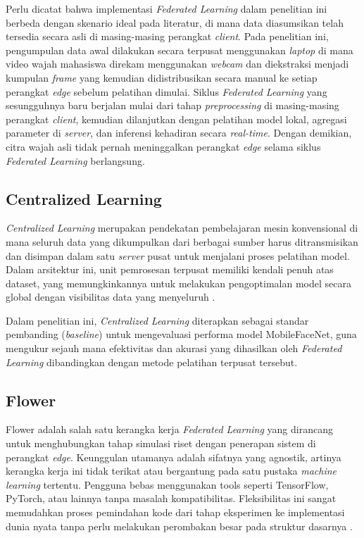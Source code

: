 Perlu dicatat bahwa implementasi \textit{Federated Learning} dalam penelitian ini berbeda dengan skenario ideal pada literatur, di mana data diasumsikan telah tersedia secara asli di masing-masing perangkat \textit{client}. Pada penelitian ini, pengumpulan data awal dilakukan secara terpusat menggunakan \textit{laptop} di mana video wajah mahasiswa direkam menggunakan \textit{webcam} dan diekstraksi menjadi kumpulan \textit{frame} yang kemudian didistribusikan secara manual ke setiap perangkat \textit{edge} sebelum pelatihan dimulai. Siklus \textit{Federated Learning} yang sesungguhnya baru berjalan mulai dari tahap \textit{preprocessing} di masing-masing perangkat \textit{client}, kemudian dilanjutkan dengan pelatihan model lokal, agregasi parameter di \textit{server}, dan inferensi kehadiran secara \textit{real-time}. Dengan demikian, citra wajah asli tidak pernah meninggalkan perangkat \textit{edge} selama siklus \textit{Federated Learning} berlangsung.

\subsection{Centralized Learning}
\label{subsec:centralized-learning-teori}

\textit{Centralized Learning} merupakan pendekatan pembelajaran mesin konvensional di mana seluruh data yang dikumpulkan dari berbagai sumber harus ditransmisikan dan disimpan dalam satu \textit{server} pusat untuk menjalani proses pelatihan model. Dalam arsitektur ini, unit pemrosesan terpusat memiliki kendali penuh atas dataset, yang memungkinkannya untuk melakukan pengoptimalan model secara global dengan visibilitas data yang menyeluruh \parencite{Tertulino2025}.

Dalam penelitian ini, \textit{Centralized Learning} diterapkan sebagai standar pembanding (\textit{baseline}) untuk mengevaluasi performa model MobileFaceNet, guna mengukur sejauh mana efektivitas dan akurasi yang dihasilkan oleh \textit{Federated Learning} dibandingkan dengan metode pelatihan terpusat tersebut.

\subsection{Flower}
\label{subsec:flower-teori}

Flower adalah salah satu kerangka kerja \textit{Federated Learning} yang dirancang untuk menghubungkan tahap simulasi riset dengan penerapan sistem di perangkat \textit{edge}. Keunggulan utamanya adalah sifatnya yang agnostik, artinya kerangka kerja ini tidak terikat atau bergantung pada satu pustaka \textit{machine learning} tertentu. Pengguna bebas menggunakan tools seperti TensorFlow, PyTorch, atau lainnya tanpa masalah kompatibilitas. Fleksibilitas ini sangat memudahkan proses pemindahan kode dari tahap eksperimen ke implementasi dunia nyata tanpa perlu melakukan perombakan besar pada struktur dasarnya \parencite{Beutel2022}.

